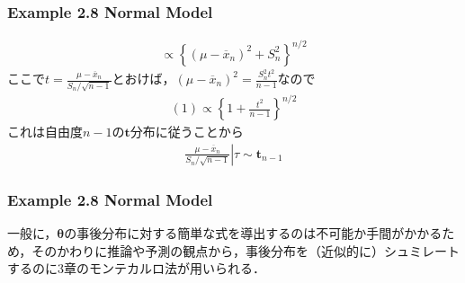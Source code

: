 \documentclass[dvipdfmx,cjk]{beamer}
\theoremstyle{example}
\begin{document}
\begin{frame}
    \frametitle{Example 2.8 Normal Model}
    \begin{align*}
        \propto \left\{(\mu-\overline{x}_n)^2+S^2_n\right\}^{n/2}\tag{1}
    \end{align*}
    ここで$t=\frac{\mu-\overline{x}_n}{S_n/\sqrt{n-1}}$とおけば，$(\mu-\overline{x}_n)^2=\frac{S_n^2t^2}{n-1}$なので
    \begin{align*}
        (1)\propto\left\{1+\frac{t^2}{n-1}\right\}^{n/2}
    \end{align*}
    これは自由度$n-1$の$\mathbf{t}$分布に従うことから
    \begin{align*}
        \left.\frac{\mu-\overline{x}_n}{S_n/\sqrt{n-1}}\right|\tau\sim \mathbf{t}_{n-1}
    \end{align*}
\end{frame}

\begin{frame}
    \frametitle{Example 2.8 Normal Model}
    一般に，$\boldsymbol{\theta}$の事後分布に対する簡単な式を導出するのは不可能か手間がかかるため，そのかわりに推論や予測の観点から，事後分布を（近似的に）シュミレートするのに3章のモンテカルロ法が用いられる．
\end{frame}
\end{document}
